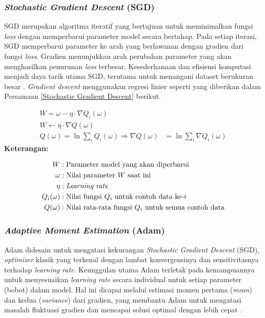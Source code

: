 \subsubsection{\textit{Stochastic Gradient Descent} (SGD)}

SGD merupakan algoritma iteratif yang bertujuan untuk meminimalkan fungsi \textit{loss} dengan memperbarui parameter 
model secara bertahap.  Pada setiap iterasi, SGD memperbarui parameter ke arah yang berlawanan dengan gradien dari 
fungsi \textit{loss}.  Gradien menunjukkan arah perubahan parameter yang akan menghasilkan penurunan \textit{loss} 
terbesar.  Kesederhanaan dan efisiensi komputasi menjadi daya tarik utama SGD, terutama untuk menangani dataset 
berukuran besar \cite{math11061360}.
\textit{Gradient descent} menggunakan regresi linier seperti yang diberikan dalam Persamaan \ref{Stochastic Gradient Descent} 
berikut.

\begin{equation}
\begin{aligned}
    W = \omega - \eta \cdot \nabla Q_i(\omega) \\
    W \leftarrow \eta \cdot \nabla Q(\omega) \\
    Q(\omega) = \ln \sum_i Q_i(\omega) 
    \Rightarrow \nabla Q(\omega) &= \ln \sum_i \nabla Q_i(\omega)
\end{aligned}
\label{Stochastic Gradient Descent}
\end{equation}
     \textbf{Keterangan:}
     
     \begin{align*}
    W & : \text{Parameter model yang akan diperbarui} \\
    \omega & : \text{Nilai parameter } W \text{ saat ini} \\
    \eta & : \text{\textit{Learning rate}} \\
    Q_i(\omega) & : \text{Nilai fungsi } Q_i \text{ untuk contoh data ke-}i \\
    Q(\omega) & : \text{Nilai rata-rata fungsi } Q_i \text{ untuk semua contoh data}
\end{align*}


    

\subsubsection{\textit{Adaptive Moment Estimation} (Adam)}
Adam didesain untuk mengatasi kekurangan \textit{Stochastic Gradient Descent} (SGD), \textit{optimizer} klasik yang terkenal dengan lambat konvergensinya dan sensitivitasnya terhadap \textit{learning rate}.  Keunggulan utama Adam terletak pada kemampuannya untuk menyesuaikan \textit{learning rate} secara individual untuk setiap parameter (bobot) dalam model.  Hal ini dicapai melalui estimasi momen pertama (\textit{mean}) dan kedua (\textit{variance}) dari gradien, yang membantu Adam untuk mengatasi masalah fluktuasi gradien dan mencapai solusi optimal dengan lebih cepat \cite{miranda2020convolutional}.

